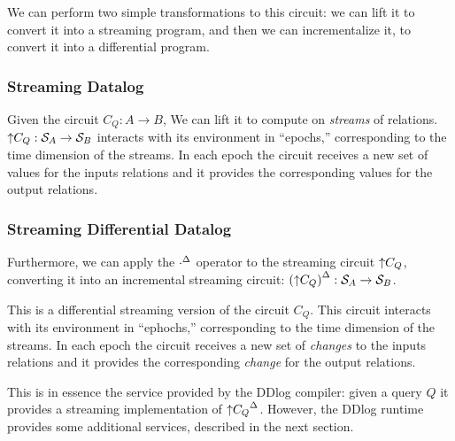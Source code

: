 We can perform two simple transformations to this circuit: we can lift it to convert it
into a streaming program, and then we can incrementalize it, to convert it into a
differential program.

\subsubsection{Streaming Datalog}

Given the circuit $C_Q: A \to B$, We can lift it to compute on \emph{streams}
of relations.  ${\uparrow}C_Q: \mathcal{S}_{A} \to \mathcal{S}_{B}$ interacts with its environment
in ``epochs,'' corresponding to the time dimension of the streams.  In each epoch the circuit
receives a new set of values for the inputs relations and it provides the corresponding values
for the output relations.


\subsubsection{Streaming Differential Datalog}

Furthermore, we can apply the ${\cdot}^{\Delta}$ operator to the streaming circuit ${\uparrow}C_Q$,
converting it into an incremental streaming circuit: ${({\uparrow}C_Q)}^{\Delta}: \mathcal{S}_{A} \to \mathcal{S}_{B}$.


This is a differential streaming version of the circuit $C_Q$.  This circuit
interacts with its environment in ``ephochs,'' corresponding to the time dimension of the streams.
In each epoch the circuit receives a new set of \emph{changes} to the inputs relations and it
provides the corresponding \emph{change} for the output relations.

This is in essence the service provided by the DDlog compiler: given a query $Q$
it provides a streaming implementation of ${{\uparrow}C_Q}^{\Delta}$.  However, the DDlog
runtime provides some additional services, described in the next section.
